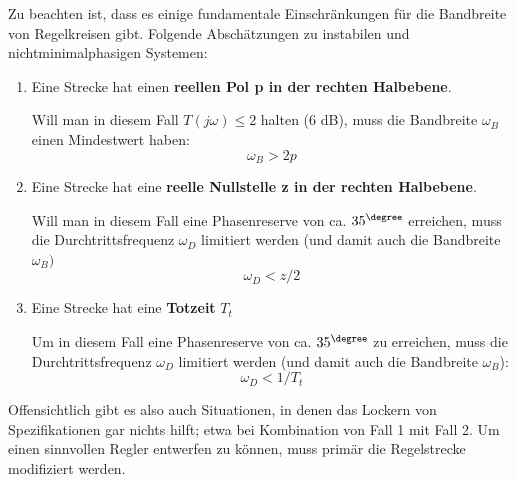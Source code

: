 Zu beachten ist, dass es einige fundamentale Einschränkungen für die Bandbreite
von Regelkreisen gibt. Folgende Abschätzungen zu
instabilen und nichtminimalphasigen Systemen:
\begin{enumerate}
\item Eine Strecke hat einen \textbf{reellen Pol p in der rechten Halbebene}. 

Will man in diesem Fall $T(j\omega) \leq 2$ halten (6 dB), muss die Bandbreite $\omega_B$
einen Mindestwert haben:
\[\omega_B > 2p\]
\item Eine Strecke hat eine \textbf{reelle Nullstelle z in der rechten 
Halbebene}.

Will man in diesem Fall eine Phasenreserve von ca. $35^{\degree}$ erreichen, muss die
Durchtrittsfrequenz $\omega_D$ limitiert werden (und damit auch die Bandbreite $\omega_B)$ \[\omega_D < z/2\]

\item Eine Strecke hat eine \textbf{Totzeit} $T_t$

Um in diesem Fall eine Phasenreserve von ca. $35^{\degree}$ zu erreichen, muss die Durchtrittsfrequenz
$\omega_D$ limitiert werden (und damit auch die Bandbreite $\omega_B$):
\[\omega_D < 1/T_t\]
\end{enumerate}
Offensichtlich gibt es also auch Situationen, in denen das Lockern von Spezifikationen
gar nichts hilft; etwa bei Kombination von Fall 1 mit Fall 2. Um einen sinnvollen
Regler entwerfen zu können, muss primär die Regelstrecke modifiziert werden.

